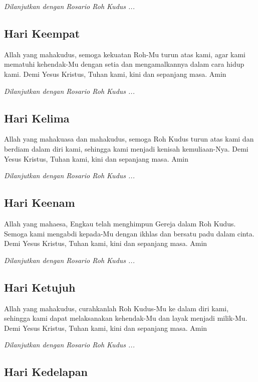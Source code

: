     \emph{Dilanjutkan dengan Rosario Roh Kudus ...}
    
\subsection*{Hari Keempat}

    Allah yang mahakudus, semoga kekuatan Roh-Mu turun atas kami, agar kami mematuhi kehendak-Mu dengan setia dan mengamalkannya dalam cara hidup kami. Demi Yesus Kristus, Tuhan kami, kini dan sepanjang masa. Amin
    
    \emph{Dilanjutkan dengan Rosario Roh Kudus ...}
    
\subsection*{Hari Kelima}

    Allah yang mahakuasa dan mahakudus, semoga Roh Kudus turun atas kami dan berdiam dalam diri kami, sehingga kami menjadi kenisah kemuliaan-Nya. Demi Yesus Kristus, Tuhan kami, kini dan sepanjang masa. Amin
    
    \emph{Dilanjutkan dengan Rosario Roh Kudus ...}
    
\subsection*{Hari Keenam}

    Allah yang mahaesa, Engkau telah menghimpun Gereja dalam Roh Kudus. Semoga kami mengabdi kepada-Mu dengan ikhlas dan bersatu padu dalam cinta. Demi Yesus Kristus, Tuhan kami, kini dan sepanjang masa. Amin
    
    \emph{Dilanjutkan dengan Rosario Roh Kudus ...}

\subsection*{Hari Ketujuh}

    Allah yang mahakudus, curahkanlah Roh Kudus-Mu ke dalam diri kami, sehingga kami dapat melaksanakan kehendak-Mu dan layak menjadi milik-Mu. Demi Yesus Kristus, Tuhan kami, kini dan sepanjang masa. Amin
    
    \emph{Dilanjutkan dengan Rosario Roh Kudus ...}
    
\subsection*{Hari Kedelapan}

